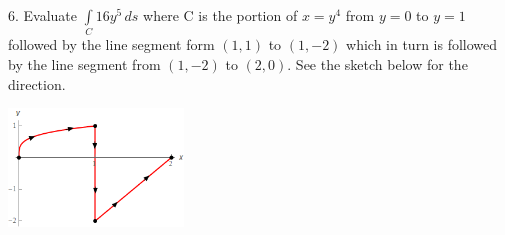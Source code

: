 \documentclass[14pt]{article}
\begin{document}
	\large{
		6. Evaluate $\displaystyle \int\limits_{C}{{16{y^5}\,ds}}$ where C is the portion of $x=y^4$ from $y=0$ to $y=1$ followed by the line segment form $\left( {1,1} \right)$ to $\left( {1,-2} \right)$ which in turn is followed by the line segment from $\left( {1,-2} \right)$ to $\left( {2,0} \right)$. See the sketch below for the direction.
	}
	\\ \begin{center}
		\includegraphics[width=0.35\textwidth]{"./Pictures/Q6.png"}
	\end{center}
	\bigskip \bigskip \bigskip
	\pagebreak
	\hspace{10pt}
\end{document}
